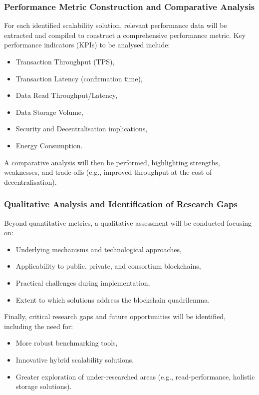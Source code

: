 \subsubsection{Performance Metric Construction and Comparative Analysis}
For each identified scalability solution, relevant performance data will be extracted and compiled to construct a comprehensive performance metric. Key performance indicators (KPIs)\cite{your-kpi-source} to be analysed include:
\begin{itemize}
    \item Transaction Throughput (TPS),
    \item Transaction Latency (confirmation time),
    \item Data Read Throughput/Latency,
    \item Data Storage Volume,
    \item Security and Decentralisation implications,
    \item Energy Consumption.
\end{itemize}

A comparative analysis will then be performed, highlighting strengths, weaknesses, and trade-offs (e.g., improved throughput at the cost of decentralisation).

\subsubsection{Qualitative Analysis and Identification of Research Gaps}
Beyond quantitative metrics, a qualitative assessment will be conducted focusing on:
\begin{itemize}
    \item Underlying mechanisms and technological approaches,
    \item Applicability to public, private, and consortium blockchains,
    \item Practical challenges during implementation,
    \item Extent to which solutions address the blockchain quadrilemma.
\end{itemize}

Finally, critical research gaps and future opportunities will be identified, including the need for:
\begin{itemize}
    \item More robust benchmarking tools,
    \item Innovative hybrid scalability solutions,
    \item Greater exploration of under-researched areas (e.g., read-performance, holistic storage solutions).
\end{itemize}
